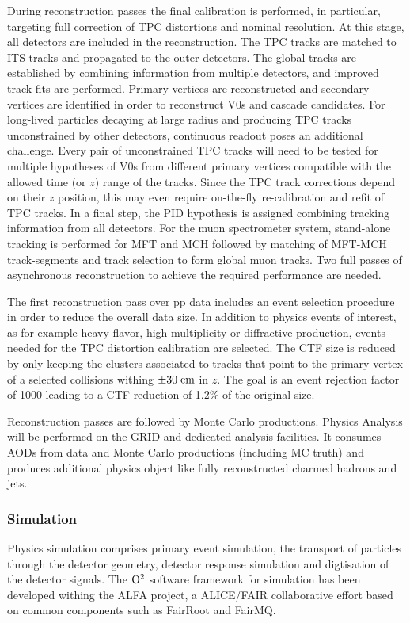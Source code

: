 During reconstruction passes the final calibration is performed, in particular, targeting full correction of TPC distortions and nominal resolution. At this stage, all detectors are included in the reconstruction. The TPC tracks are matched to ITS
tracks and propagated to the outer detectors. The global tracks are established
by combining information from
multiple detectors, and improved track fits are performed.
Primary vertices are reconstructed and secondary vertices are identified in order to
reconstruct V0s and cascade candidates. For long-lived particles decaying at large
radius and producing  TPC tracks unconstrained by other detectors, continuous readout poses an additional challenge. Every pair of unconstrained TPC tracks will need to be
tested for multiple hypotheses of V0s from different primary vertices compatible with
the allowed time (or $z$) range of the tracks. Since the TPC track corrections depend on their $z$ position, this may even require on-the-fly re-calibration and refit of
TPC tracks.  In a final step, the PID hypothesis is assigned combining tracking information from all detectors. For the muon spectrometer system, stand-alone tracking is performed for MFT and
MCH followed by matching of MFT-MCH track-segments and track selection to form global muon tracks. Two full passes of asynchronous reconstruction to achieve the required performance are needed.

The first reconstruction pass over pp data includes an event selection procedure in order to reduce the
overall data size. In addition to physics events of interest, as for example heavy-flavor,
high-multiplicity or diffractive production, events needed for the TPC distortion calibration are
selected. The CTF size is reduced by only keeping the clusters associated to tracks that point to the
primary vertex of a selected collisions withing $\pm 30 \; {\rm cm}$ in $z$. The goal is an event rejection factor of 1000 leading to a CTF reduction of 1.2\% of the original size.

Reconstruction passes are followed by Monte Carlo productions.
Physics Analysis will be performed on the GRID and dedicated analysis facilities. It consumes AODs from data and Monte Carlo productions (including MC truth)
and produces additional physics object like fully reconstructed charmed hadrons and jets.

\subsubsection{Simulation}
Physics simulation comprises primary event simulation, the transport of particles through the detector
geometry, detector response simulation and digtisation of the detector signals.
The ${\rm O}^2$ software framework for simulation has been developed withing the ALFA project, a ALICE/FAIR
collaborative effort based on common components such as FairRoot and FairMQ.

